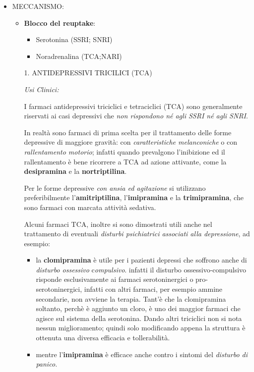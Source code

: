 \begin{itemize}
\item MECCANISMO:

\begin{itemize}
\item
  \textbf{Blocco del reuptake}:

  \begin{itemize}
  \item
    Serotonina (SSRI; SNRI)
  \item
    Noradrenalina (TCA;NARI)
  \end{itemize}
\end{itemize}

\begin{itemize}
\item[1.] ANTIDEPRESSIVI TRICILICI (TCA)

\emph{\emph{Usi Clinici:}}

I farmaci antidepressivi triciclici e tetraciclici (TCA) sono
generalmente riservati ai casi depressivi che \emph{non rispondono né
agli SSRI né agli SNRI}.

In realtà sono farmaci di prima scelta per il trattamento delle forme
depressive di maggiore gravità: con \emph{caratteristiche melanconiche}
o con \emph{rallentamento motorio}; infatti quando prevalgono
l'inibizione ed il rallentamento è bene ricorrere a TCA ad azione
attivante, come la \textbf{desipramina} e la \textbf{nortriptilina}.

Per le forme depressive \emph{con ansia ed agitazione} si utilizzano
preferibilmente l'\textbf{amitriptilina}, l'\textbf{imipramina} e la
\textbf{trimipramina}, che sono farmaci con marcata attività sedativa.

Alcuni farmaci TCA, inoltre si sono dimostrati utili anche nel
trattamento di eventuali \emph{disturbi psichiatrici associati alla
depressione}, ad esempio:

\begin{itemize}
\item
  la \textbf{clomipramina} è utile per i pazienti depressi che soffrono
  anche di \emph{disturbo ossessivo} c\emph{ompulsivo}. infatti il
  disturbo ossessivo-compulsivo risponde esclusivamente ai farmaci
  serotoninergici o pro-serotoninergici, infatti con altri farmaci, per
  esempio ammine secondarie, non avviene la terapia. Tant'è che la
  clomipramina soltanto, perchè è aggiunto un cloro, è uno dei maggior
  farmaci che agisce sul sistema della serotonina. Dando altri
  triciclici non si nota nessun miglioramento; quindi solo modificando
  appena la struttura è ottenuta una diversa efficacia e tollerabilità.
\item
  mentre l'\textbf{imipramina} è efficace anche contro i sintomi del
  \emph{disturbo di panico.}
\end{itemize}


\end{itemize}
\end{itemize}
